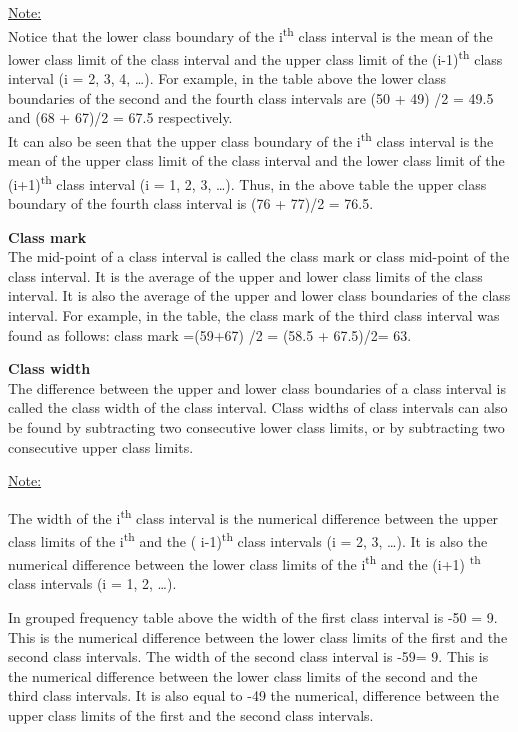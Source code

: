\documentclass[
]{book}
\begin{document}
\underline{Note:}\\
Notice that the lower class boundary of the i\textsuperscript{th} class interval is the mean of the lower class limit of the class interval and the upper class limit of the (i-1)\textsuperscript{th} class interval (i = 2, 3, 4, \ldots). For example, in the table above the lower class boundaries of the second and the fourth class intervals are (50 + 49) /2 = 49.5 and (68 + 67)/2 = 67.5 respectively.\\
It can also be seen that the upper class boundary of the i\textsuperscript{th} class interval is the mean of the upper class limit of the class interval and the lower class limit of the (i+1)\textsuperscript{th} class interval (i = 1, 2, 3, \ldots). Thus, in the above table the upper class boundary of the fourth class
interval is (76 + 77)/2 = 76.5.

\textbf{Class mark}\\
The mid-point of a class interval is called the class mark or class mid-point of the class interval. It is the average of the upper and lower class limits of the class interval. It is also the average of the upper and lower class boundaries of the class interval. For example, in the table, the class mark of the third class interval was found as
follows: class mark =(59+67) /2 = (58.5 + 67.5)/2= 63.

\textbf{Class width}\\
The difference between the upper and lower class boundaries of a class interval is called the class width of the class interval. Class widths of class intervals can also be found by subtracting two consecutive lower class limits, or by subtracting two consecutive upper class limits.

\underline{Note:}

The width of the i\textsuperscript{th} class interval is the numerical difference between the upper class limits of the i\textsuperscript{th} and the ( i-1)\textsuperscript{th} class intervals (i = 2, 3, \ldots). It is also the numerical difference between the lower class limits of the i\textsuperscript{th} and the (i+1) \textsuperscript{th} class intervals (i = 1, 2, \ldots).

In grouped frequency table above the width of the first class interval is -50\textbar{} = 9. This is the numerical difference between the lower class limits of the first and the second class intervals. The width of the second class interval is -59\textbar= 9. This is the numerical difference between the lower class limits of the second and the third
class intervals. It is also equal to -49\textbar{} the numerical, difference between the upper class limits of the first and the second class intervals.
\end{document}
